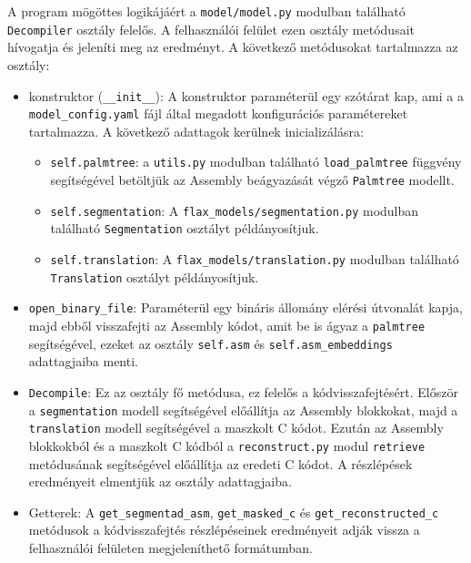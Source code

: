     A program mögöttes logikájáért a \texttt{model/model.py} modulban található \texttt{Decompiler}
    osztály felelős. A felhasználói felület ezen osztály metódusait hívogatja és jeleníti meg az eredményt.
    A következő metódusokat tartalmazza az osztály:
    \begin{itemize}
        \item konstruktor (\texttt{\_\_init\_\_}): A konstruktor paraméterül egy szótárat kap, ami a
            a \texttt{model\_config.yaml} fájl által megadott konfigurációs paramétereket tartalmazza.
            A következő adattagok kerülnek inicializálásra:
            \begin{itemize}
                \item \texttt{self.palmtree}: a \texttt{utils.py} modulban található \texttt{load\_palmtree}
                    függvény segítségével betöltjük az Assembly beágyazását végző \texttt{Palmtree} modellt.
                \item \texttt{self.segmentation}: A \texttt{flax\_models/segmentation.py} modulban található
                    \texttt{Segmentation} osztályt példányosítjuk.
                \item \texttt{self.translation}: A \texttt{flax\_models/translation.py} modulban található
                \texttt{Translation} osztályt példányosítjuk.
            \end{itemize}
        \item \texttt{open\_binary\_file}: Paraméterül egy bináris állomány elérési útvonalát kapja, majd
            ebből visszafejti az Assembly kódot, amit be is ágyaz a \texttt{palmtree} segítségével, ezeket
            az osztály \texttt{self.asm} és \texttt{self.asm\_embeddings} adattagjaiba menti.
        \item \texttt{Decompile}: Ez az osztály fő metódusa, ez felelős a kódvisszafejtésért.
            Először a \texttt{segmentation} modell segítségével előállítja az Assembly blokkokat,
            majd a \texttt{translation} modell segítségével a maszkolt C kódot. Ezután az Assembly blokkokból
            és a maszkolt C kódból a \texttt{reconstruct.py} modul \texttt{retrieve} metódusának segítségével
            előállítja az eredeti C kódot. A részlépések eredményeit elmentjük az osztály adattagjaiba.
        \item Getterek: A \texttt{get\_segmentad\_asm}, \texttt{get\_masked\_c} és \texttt{get\_reconstructed\_c}
            metódusok a kódvisszafejtés részlépéseinek eredményeit adják vissza a felhasználói felületen
            megjeleníthető formátumban.
    \end{itemize}

